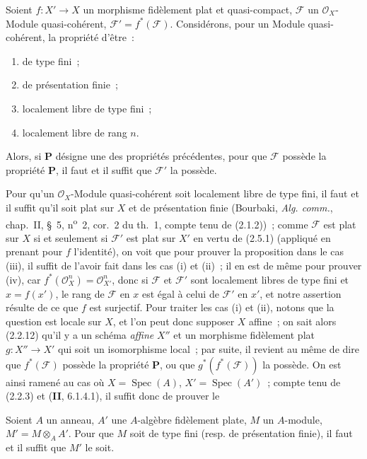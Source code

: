\begin{proposition}[2.5.2]
Soient $f:X'\to X$ un morphisme fidèlement plat et quasi-compact,
$\mathscr F$ un $\mathcal O_X$-Module quasi-cohérent,
$\mathscr F'=f^*(\mathscr F)$. Considérons, pour un Module quasi-cohérent, la
propriété d'être~:
\begin{enumerate}
\item[\textup{(i)}] de type fini~;
\item[\textup{(ii)}] de présentation finie~;
\item[\textup{(iii)}] localement libre de type fini~;
\item[\textup{(iv)}] localement libre de rang $n$.
\end{enumerate}
Alors, si $\boldsymbol{P}$ désigne une des propriétés précédentes, pour que
$\mathscr F$ possède la propriété $\boldsymbol{P}$, il faut et il suffit que
$\mathscr F'$ la possède.
\end{proposition}

Pour qu'un $\mathcal O_X$-Module quasi-cohérent soit localement libre de type
fini, il faut et il suffit qu'il soit plat sur $X$ et de présentation finie
(Bourbaki, \emph{Alg. comm.}, chap.~II, \S~5, n\textsuperscript{o}~2,
cor.~2 du th.~1, compte tenu de (2.1.2))~; comme $\mathscr F$ est plat sur
$X$ si et seulement si $\mathscr F'$ est plat sur $X'$ en vertu de (2.5.1)
(appliqué en prenant pour $f$ l'identité), on voit que pour prouver la
proposition dans le cas (iii), il suffit de l'avoir fait dans les cas (i) et
(ii)~; il en est de même pour prouver (iv), car
$f^*(\mathcal O_X^n)=\mathcal O_{X'}^n$, donc si $\mathscr F$ et
$\mathscr F'$ sont localement libres de type fini et $x=f(x')$, le rang de
$\mathscr F$ en $x$ est égal à celui de $\mathscr F'$ en $x'$, et notre
assertion résulte de ce que $f$ est surjectif. Pour traiter les cas (i) et
(ii),
notons que la question est locale sur $X$, et l'on peut donc supposer $X$
affine~; on sait alors (2.2.12) qu'il y a un schéma \emph{affine} $X''$ et un
morphisme fidèlement plat $g:X''\to X'$ qui soit un isomorphisme local~; par
suite, il revient au même de dire que $f^*(\mathscr F)$ possède la propriété
$\boldsymbol{P}$, ou que $g^*(f^*(\mathscr F))$ la possède. On est ainsi ramené au
cas où $X=\operatorname{Spec}(A)$, $X'=\operatorname{Spec}(A')$~; compte tenu
de (2.2.3) et (\textbf{II}, 6.1.4.1), il suffit donc de prouver le

\begin{lemma}[2.5.3]
\label{IV.2.5.3-fr}
Soient $A$ un anneau, $A'$ une $A$-algèbre fidèlement plate, $M$ un
$A$-module, $M'=M\otimes_A A'$. Pour que $M$ soit de type fini \textup{(resp.} de
présentation finie), il faut et il suffit que $M'$ le soit.
\end{lemma}

